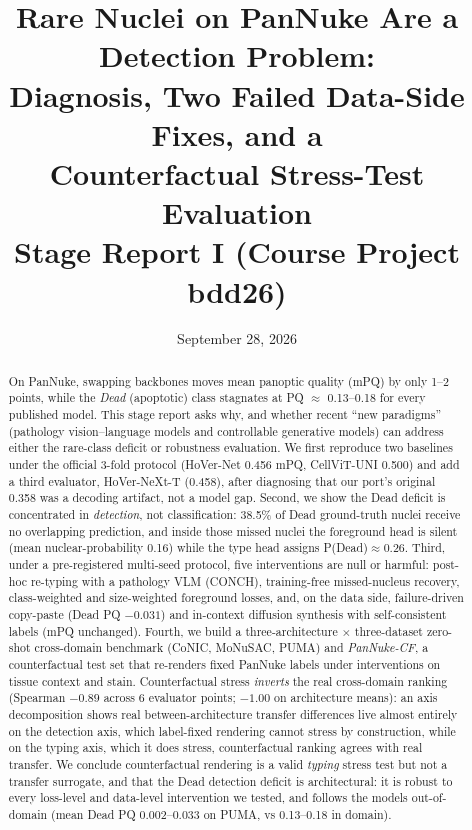 \documentclass[11pt]{article}
\title{\bfseries Rare Nuclei on PanNuke Are a Detection Problem:\\
Diagnosis, Two Failed Data-Side Fixes, and a\\ Counterfactual Stress-Test Evaluation\\[6pt]
\large Stage Report I (Course Project bdd26)}
\author{}
\date{September 28, 2026}
\begin{document}
\maketitle

\begin{abstract}
On PanNuke, swapping backbones moves mean panoptic quality (mPQ) by only 1--2 points, while the
\emph{Dead} (apoptotic) class stagnates at PQ $\approx$ 0.13--0.18 for every published model. This
stage report asks why, and whether recent ``new paradigms'' (pathology vision--language models
and controllable generative models) can address either the rare-class deficit or robustness
evaluation. We first reproduce two baselines under the official 3-fold protocol (HoVer-Net
0.456 mPQ, CellViT-UNI 0.500) and add a third evaluator, HoVer-NeXt-T (0.458), after diagnosing
that our port's original 0.358 was a decoding artifact, not a model gap. Second, we show the Dead
deficit is concentrated in \emph{detection}, not classification: 38.5\% of Dead ground-truth
nuclei receive no overlapping prediction, and inside those missed nuclei the foreground head is
silent (mean nuclear-probability 0.16) while the type head assigns P(Dead)$\approx$0.26. Third,
under a pre-registered multi-seed protocol, five interventions are null or harmful: post-hoc
re-typing with a pathology VLM (CONCH), training-free missed-nucleus recovery, class-weighted and
size-weighted foreground losses, and, on the data side, failure-driven copy-paste (Dead PQ
$-0.031$) and in-context diffusion synthesis with self-consistent labels (mPQ unchanged).
Fourth, we build a three-architecture $\times$ three-dataset zero-shot cross-domain benchmark
(CoNIC, MoNuSAC, PUMA) and \emph{PanNuke-CF}, a counterfactual test set that re-renders fixed
PanNuke labels under interventions on tissue context and stain. Counterfactual stress
\emph{inverts} the real cross-domain ranking (Spearman $-0.89$ across 6 evaluator points;
$-1.00$ on architecture means): an axis decomposition shows real between-architecture transfer
differences live almost entirely on the detection axis, which label-fixed rendering cannot
stress by construction, while on the typing axis, which it does stress, counterfactual ranking
agrees with real transfer. We conclude counterfactual rendering is a valid \emph{typing} stress
test but not a transfer surrogate, and that the Dead detection deficit is architectural: it is
robust to every loss-level and data-level intervention we tested, and follows the models
out-of-domain (mean Dead PQ 0.002--0.033 on PUMA, vs 0.13--0.18 in domain).
\end{abstract}
\end{document}
